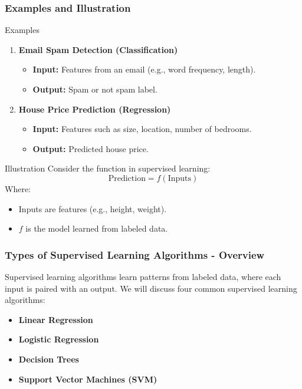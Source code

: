 \documentclass[aspectratio=169]{beamer}
\begin{document}
\begin{frame}[fragile]
    \frametitle{Examples and Illustration}
    \begin{block}{Examples}
        \begin{enumerate}
            \item \textbf{Email Spam Detection (Classification)}
            \begin{itemize}
                \item \textbf{Input:} Features from an email (e.g., word frequency, length).
                \item \textbf{Output:} Spam or not spam label.
            \end{itemize}

            \item \textbf{House Price Prediction (Regression)}
            \begin{itemize}
                \item \textbf{Input:} Features such as size, location, number of bedrooms.
                \item \textbf{Output:} Predicted house price.
            \end{itemize}
        \end{enumerate}
    \end{block}

    \begin{block}{Illustration}
        Consider the function in supervised learning:
        \begin{equation}
            \text{Prediction} = f(\text{Inputs})
        \end{equation}
        Where:
        \begin{itemize}
            \item Inputs are features (e.g., height, weight).
            \item \( f \) is the model learned from labeled data.
        \end{itemize}
    \end{block}
\end{frame}

\begin{frame}[fragile]
    \frametitle{Types of Supervised Learning Algorithms - Overview}
    Supervised learning algorithms learn patterns from labeled data, where each input is paired with an output. 
    We will discuss four common supervised learning algorithms: 
    \begin{itemize}
        \item \textbf{Linear Regression}
        \item \textbf{Logistic Regression}
        \item \textbf{Decision Trees}
        \item \textbf{Support Vector Machines (SVM)}
    \end{itemize}
\end{frame}
\end{document}
